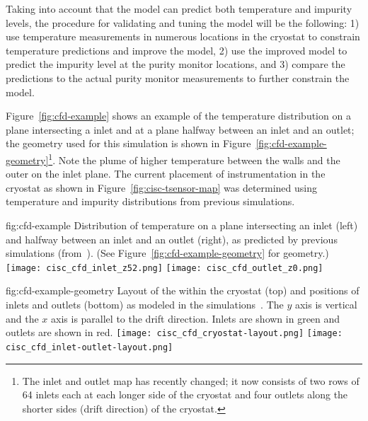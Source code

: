 
Taking into account that the  model can predict both temperature and impurity levels, the procedure for validating and tuning the  model will be the following: 1) use temperature measurements in numerous locations in the cryostat to constrain temperature predictions and  improve the  model, 2) use the improved model  to predict the \lar impurity level at the purity monitor locations, and 3) compare the predictions to the actual  purity monitor measurements to further constrain the  model.  

Figure~\ref{fig:cfd-example} shows an example of the temperature
distribution on a plane intersecting a  inlet and at a
plane halfway between an inlet and an outlet; 
the geometry used for
this simulation is shown in Figure~\ref{fig:cfd-example-geometry}\footnote{The inlet and outlet map has recently changed; it now consists of two rows of 64 inlets each at each longer side of the cryostat and four outlets along the shorter sides (drift direction) of the cryostat.}. Note the plume of higher temperature  between the walls and
the outer  on the inlet plane. The current placement of instrumentation in
the cryostat as shown in Figure~\ref{fig:cisc-tsensor-map} was determined using temperature and impurity distributions from previous simulations.

\begin{dunefigure}{fig:cfd-example}
  {Distribution of temperature on a plane intersecting an inlet (left) and halfway between an inlet and an outlet (right), as predicted by previous  simulations (from~\cite{bib:docdb5915}). (See Figure~\ref{fig:cfd-example-geometry} for geometry.)}
  \texttt{[image: cisc\_cfd\_inlet\_z52.png]}
  \texttt{[image: cisc\_cfd\_outlet\_z0.png]}
\end{dunefigure}

\begin{dunefigure}{fig:cfd-example-geometry}
  {Layout of the \single {} within the cryostat (top) and positions of  inlets and outlets (bottom) as modeled in the  simulations~\cite{bib:docdb5915}. The $y$ axis is vertical and the $x$ axis is parallel to the  drift direction. Inlets are shown in green and outlets are shown in red.}
  \texttt{[image: cisc\_cfd\_cryostat-layout.png]}
  \texttt{[image: cisc\_cfd\_inlet-outlet-layout.png]}
\end{dunefigure}

